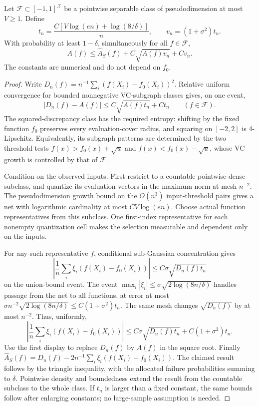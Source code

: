 \begin{lemma}
\label{lem:subgaussian-VC-excess}
Let $\mathcal F\subset[-1,1]^{\mathcal X}$ be a pointwise separable class of pseudodimension at most $V\ge1$. Define
\[
 t_n=\frac{C[V\log(en)+\log(8/\delta)]}{n},
 \qquad v_n=(1+\sigma^2)t_n.
\]
With probability at least $1-\delta$, simultaneously for all $f\in\mathcal F$,
\[
 A(f)\le\widehat A_S(f)+C\sqrt{A(f)v_n}+Cv_n.
\]
The constants are numerical and do not depend on $f_0$.
\end{lemma}
\begin{proof}
Write $D_n(f)=n^{-1}\sum_i(f(X_i)-f_0(X_i))^2$. Relative uniform convergence for bounded nonnegative VC-subgraph classes gives, on one event,
\[
 |D_n(f)-A(f)|\le C\sqrt{A(f)t_n}+Ct_n\qquad(f\in\mathcal F).
\]
The squared-discrepancy class has the required entropy: shifting by the fixed function $f_0$ preserves every evaluation-cover radius, and squaring on $[-2,2]$ is 4-Lipschitz. Equivalently, its subgraph patterns are determined by the two threshold tests $f(x)>f_0(x)+\sqrt u$ and $f(x)<f_0(x)-\sqrt u$, whose VC growth is controlled by that of $\mathcal F$.

Condition on the observed inputs. First restrict to a countable pointwise-dense subclass, and quantize its evaluation vectors in the maximum norm at mesh $n^{-2}$. The pseudodimension growth bound on the $O(n^3)$ input-threshold pairs gives a net with logarithmic cardinality at most $C V\log(en)$. Choose actual function representatives from this subclass. One first-index representative for each nonempty quantization cell makes the selection measurable and dependent only on the inputs.

For any such representative $f$, conditional sub-Gaussian concentration gives
\[
 \left|\frac1n\sum_i\xi_i(f(X_i)-f_0(X_i))\right|
 \le C\sigma\sqrt{D_n(f)t_n}
\]
on the union-bound event. The event
$\max_i|\xi_i|\le\sigma\sqrt{2\log(8n/\delta)}$ handles passage from the net to all functions, at error at most
$\sigma n^{-2}\sqrt{2\log(8n/\delta)}\le C(1+\sigma^2)t_n$.
The same mesh changes $\sqrt{D_n(f)}$ by at most $n^{-2}$. Thus, uniformly,
\[
 \left|\frac1n\sum_i\xi_i(f(X_i)-f_0(X_i))\right|
 \le C\sigma\sqrt{D_n(f)t_n}+C(1+\sigma^2)t_n.
\]
Use the first display to replace $D_n(f)$ by $A(f)$ in the square root. Finally
$\widehat A_S(f)=D_n(f)-2n^{-1}\sum_i\xi_i(f(X_i)-f_0(X_i))$.
The claimed result follows by the triangle inequality, with the allocated failure probabilities summing to $\delta$. Pointwise density and boundedness extend the result from the countable subclass to the whole class. If $t_n$ is larger than a fixed constant, the same bounds follow after enlarging constants; no large-sample assumption is needed.
\end{proof}

